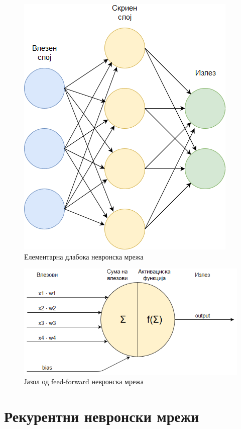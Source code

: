 \begin{figure}[H]
	\centering
    \includegraphics[scale=0.66]{images/nn.png}
	\caption{Елементарна длабока невронска мрежа}
	\label{fig:nn}
\end{figure}

\begin{figure}[H]
	\centering
    \includegraphics[scale=0.6]{images/nn_cell.png}
	\caption{Јазол од feed-forward невронска мрежа}
	\label{fig:ff_node}
\end{figure}


\section{Рекурентни невронски мрежи}

